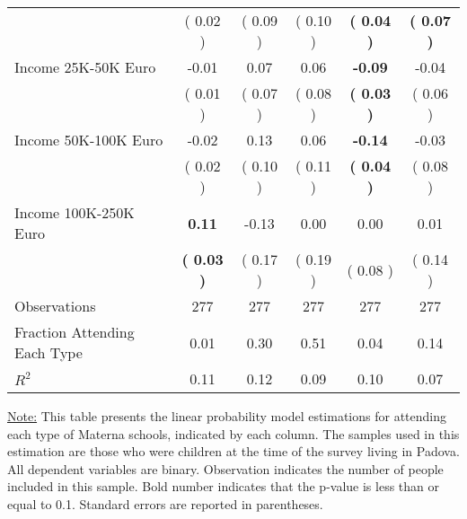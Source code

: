\begin{table}[H]
{\begin{tabular}{lccccc}
\quad  & (     0.02 ) & (     0.09 )  & (     0.10 )  & \textbf{(     0.04 )} & \textbf{(     0.07 )} \\
\quad Income 25K-50K Euro &     -0.01 &      0.07 &      0.06 & \textbf{    -0.09} &     -0.04 \\
\quad  & (     0.01 ) & (     0.07 )  & (     0.08 )  & \textbf{(     0.03 )} & (     0.06 ) \\
\quad Income 50K-100K Euro &     -0.02 &      0.13 &      0.06 & \textbf{    -0.14} &     -0.03 \\
\quad  & (     0.02 ) & (     0.10 )  & (     0.11 )  & \textbf{(     0.04 )} & (     0.08 ) \\
\quad Income 100K-250K Euro & \textbf{     0.11} &     -0.13 &      0.00 &      0.00 &      0.01 \\
\quad  & \textbf{(     0.03 )} & (     0.17 )  & (     0.19 )  & (     0.08 ) & (     0.14 ) \\
\midrule
Observations & 277 & 277 & 277 & 277 & 277 \\
Fraction Attending Each Type &      0.01 &      0.30 &      0.51 &      0.04 &      0.14 \\
\midrule
$ R^2$ &      0.11 &      0.12 &      0.09 &      0.10 &      0.07 \\
\bottomrule
\end{tabular}}
\end{table}
\begin{scriptsize}
\noindent\underline{Note:} This table presents the linear probability model estimations for attending each type of Materna schools, indicated by each column. The samples used in this estimation are those who were children at the time of the survey living in Padova. All dependent variables are binary. Observation indicates the number of people included in this sample. Bold number indicates that the p-value is less than or equal to 0.1. Standard errors are reported in parentheses.
\end{scriptsize}
